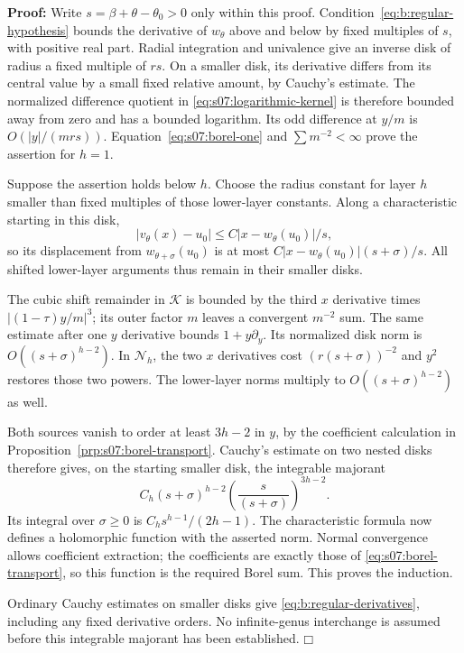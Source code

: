 \documentclass[a4paper,10pt]{article}
\numberwithin{equation}{section}
\theoremstyle{paperplain}
\theoremstyle{paperremark}
\theoremstyle{paperplain}
\newenvironment{prf}{\noindent \textbf{Proof: }}{\hfill $\mdlgwhtsquare$\par\addvspace{0.5\baselineskip}}
\begin{document}
\begin{prf}
Write $s=\beta+\theta-\theta_0>0$ only within this proof.
Condition~\eqref{eq:b:regular-hypothesis} bounds the derivative of
$w_\theta$ above and below by fixed multiples of $s$, with
positive real part. Radial integration and univalence give an inverse
disk of radius a fixed multiple of $r s$. On a smaller
disk, its derivative differs from its central value by a small fixed
relative amount, by Cauchy's estimate. The normalized difference
quotient in \eqref{eq:s07:logarithmic-kernel} is therefore bounded
away from zero and has a bounded logarithm. Its odd difference at
$y/m$ is $O(|y|/(m r s))$. Equation~\eqref{eq:s07:borel-one}
and $\sum m^{-2}<\infty$ prove the assertion for $h=1$.

Suppose the assertion holds below $h$. Choose the radius constant
for layer $h$ smaller than fixed multiples of those lower-layer
constants. Along a characteristic starting in this disk,
\[
 |v_\theta(x)-u_0|
       \leq C|x-w_\theta(u_0)|/s,
\]
so its displacement from $w_{\theta+\sigma}(u_0)$ is at most
$C|x-w_\theta(u_0)|(s+\sigma)/s$.
All shifted lower-layer arguments thus remain in their smaller disks.

The cubic shift remainder in $\mathcal K$ is bounded by the third
$x$ derivative times $|(1-\tau)y/m|^3$; its outer factor $m$
leaves a convergent $m^{-2}$ sum. The same estimate after one
$y$ derivative bounds $1+y\partial_y$. Its normalized disk norm
is $O((s+\sigma)^{h-2})$. In $\mathcal N_h$, the two
$x$ derivatives cost $(r (s+\sigma))^{-2}$ and $y^2$
restores those two powers. The lower-layer norms multiply to
$O((s+\sigma)^{h-2})$ as well.

Both sources vanish to order at least $3h-2$ in $y$, by the
coefficient calculation in Proposition~\ref{prp:s07:borel-transport}.
Cauchy's estimate on two nested disks therefore gives, on the
starting smaller disk, the integrable majorant
\begin{equation}\label{eq:b:regular-integral}
 C_h (s+\sigma)^{h-2}
         \left(\frac{s}{(s+\sigma)}\right)^{3h-2}.
\end{equation}
Its integral over $\sigma\geq0$ is
$C_h s^{h-1}/(2h-1)$. The characteristic formula now
defines a holomorphic function with the asserted norm. Normal
convergence allows coefficient extraction; the coefficients are
exactly those of \eqref{eq:s07:borel-transport}, so this function
is the required Borel sum. This proves the induction.

Ordinary Cauchy estimates on smaller disks give
\eqref{eq:b:regular-derivatives}, including any fixed derivative
orders. No infinite-genus interchange is assumed before this
integrable majorant has been established.
\end{prf}
\end{document}
